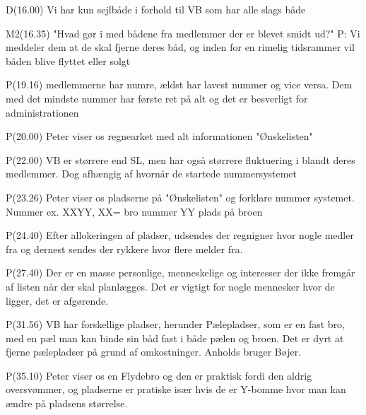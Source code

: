 \documentclass[12pt,a4paper]{article}
\begin{document}
D(16.00) Vi har kun sejlbåde i forhold til VB som har alle slags både

M2(16.35) "Hvad gør i med bådene fra medlemmer der er blevet smidt ud?"
P: Vi meddeler dem at de skal fjerne deres båd, og inden for en rimelig tidsrammer vil båden blive flyttet eller solgt

P(19.16) medlemmerne har numre, ældst har lavest nummer og vice versa. Dem med det mindste nummer har første ret på alt og det er besverligt for administrationen

P(20.00) Peter viser os regnearket med alt informationen "Ønskelisten"

P(22.00) VB er størrere end SL, men har også størrere fluktuering i blandt deres medlemmer. Dog afhængig af hvornår de startede nummersystemet

P(23.26) Peter viser os pladserne på "Ønskelisten" og forklare nummer systemet. Nummer ex. XXYY, XX= bro nummer YY plads på broen

P(24.40) Efter allokeringen af pladser, udsendes der regnigner hvor nogle medler fra og dernest sendes der rykkere hvor flere melder fra.

P(27.40) Der er en masse personlige, menneskelige og interesser der ikke fremgår af listen når der skal planlægges. Det er vigtigt for nogle mennesker hvor de ligger, det er afgørende.

P(31.56) VB har forskellige pladser, herunder Pælepladser, som er en fast bro, med en pæl man kan binde sin båd fast i både pælen og broen. Det er dyrt at fjerne pælepladser på grund af omkostninger. Anholds bruger Bøjer.

P(35.10) Peter viser os en Flydebro og den er praktisk fordi den aldrig oversvømmer, og pladserne er pratiske især hvis de er Y-bomme hvor man kan ændre på pladsens størrelse.
\end{document}
